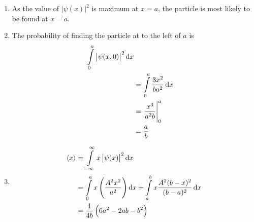 \documentclass[fleqn, a4paper, 11pt, oneside]{amsart}
\theoremstyle{definition}
\theoremstyle{theorem}
\renewcommand{\emph}{\uline}
\begin{document}
\begin{solution}
\begin{enumerate}[leftmargin=*]
\begin{figure}[H]
			\end{figure}
		\item
			As the value of $|\psi(x)|^2$ is maximum at $x = a$, the particle is most likely to be found at \emph{$x = a$}.
		\item
			The probability of finding the particle at to the left of $a$ is
			\begin{align*}
				\int\limits_{0}^{a} \left| \psi(x,0) \right|^2 \dif x\\
				&= \int\limits_{0}^{a} \frac{3 x^2}{b a^2} \dif x\\
				&= \left. \frac{x^3}{a^2 b} \right|_{0}^{a}\\
				&= \frac{a}{b}
			\end{align*}
		\item
			\begin{align*}
				\langle x \rangle &= \int\limits_{-\infty}^{\infty} x \left| \psi(x) \right|^2 \dif x\\
				&= \int\limits_{0}^{a} x \left( \frac{A^2 x^2}{a^2} \right) \dif x + \int\limits_{a}^{b} x \frac{A^2 (b - x)^2}{(b - a)^2} \dif x\\
				&= \frac{1}{4 b} \left( 6 a^2 - 2 a b - b^2 \right)
			\end{align*}
	\end{enumerate}
\end{solution}
\end{document}
